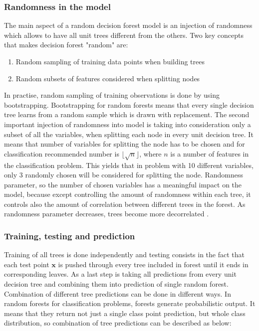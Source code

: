 \subsubsection{Randomness in the model}
The main aspect of a random decision forest model is an injection of randomness which allows to have all unit trees different from the others. Two key concepts that makes decision forest "random" are:
\begin{enumerate}
	\item Random sampling of training data points when building trees
	\item Random subsets of features considered when splitting nodes
\end{enumerate}
In practise, random sampling of training observations is done by using bootstrapping. 
Bootstrapping for random forests means that every single decision tree learns from a random sample which is drawn with replacement. 
The second important injection of randomness into model is taking into consideration only a subset of all the variables, 
when splitting each node in every unit decision tree. It means that number of variables for splitting the node has to be chosen 
and for classification recommended number is $\lfloor{\sqrt{n}} \rfloor$, 
where $n$ is a number of features in the classification problem. This yields that in problem with 10 different variables, 
only 3 randomly chosen will be considered for splitting the node. Randomness parameter, 
so the number of chosen variables has a meaningful impact on the model, 
because except controlling the amount of randomness within each tree, 
it controls also the amount of correlation between different trees in the forest. 
As randomness parameter decreases, trees become more decorrelated \cite{criminisi2012decision}.

\subsubsection {Training, testing and prediction}
Training of all trees is done independently and testing consists in the fact that each test point $\textbf{x}$ is pushed 
through every tree included in forest until it ends in corresponding leaves. As a last step is taking all predictions from 
every unit decision tree and combining them into prediction of single random forest. Combination of different tree predictions 
can be done in different ways. In random forests for classification problems, forests generate probabilistic output. 
It means that they return not just a single class point prediction, but whole class distribution, 
so combination of tree predictions can be described as below:

